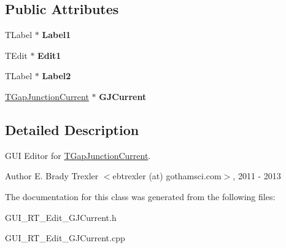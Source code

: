 \subsection*{Public Attributes}
\begin{DoxyCompactItemize}
\item 
\hypertarget{class_t_g_j_current_form_a404d5114c80a0d9807c20cec17d3adfa}{T\+Label $\ast$ {\bfseries Label1}}\label{class_t_g_j_current_form_a404d5114c80a0d9807c20cec17d3adfa}

\item 
\hypertarget{class_t_g_j_current_form_adaeec92c812d0c2f51452253778974bc}{T\+Edit $\ast$ {\bfseries Edit1}}\label{class_t_g_j_current_form_adaeec92c812d0c2f51452253778974bc}

\item 
\hypertarget{class_t_g_j_current_form_af2b4187cb3820cac1597fddefaa043fd}{T\+Label $\ast$ {\bfseries Label2}}\label{class_t_g_j_current_form_af2b4187cb3820cac1597fddefaa043fd}

\item 
\hypertarget{class_t_g_j_current_form_a8fe2de07f6e52ed84e51ffe434c01627}{\hyperlink{class_t_gap_junction_current}{T\+Gap\+Junction\+Current} $\ast$ {\bfseries G\+J\+Current}}\label{class_t_g_j_current_form_a8fe2de07f6e52ed84e51ffe434c01627}

\end{DoxyCompactItemize}


\subsection{Detailed Description}
G\+U\+I Editor for \hyperlink{class_t_gap_junction_current}{T\+Gap\+Junction\+Current}. 

\begin{DoxyAuthor}{Author}
E. Brady Trexler $<$ebtrexler (at) gothamsci.\+com$>$, 2011 -\/ 2013 
\end{DoxyAuthor}


The documentation for this class was generated from the following files\+:\begin{DoxyCompactItemize}
\item 
G\+U\+I\+\_\+\+R\+T\+\_\+\+Edit\+\_\+\+G\+J\+Current.\+h\item 
G\+U\+I\+\_\+\+R\+T\+\_\+\+Edit\+\_\+\+G\+J\+Current.\+cpp\end{DoxyCompactItemize}
